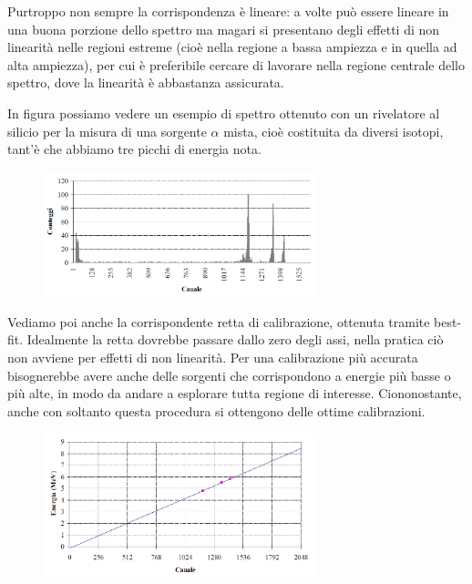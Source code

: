 Purtroppo non sempre la corrispondenza è lineare: a volte può essere lineare in una buona porzione dello spettro ma magari si presentano degli effetti di non linearità nelle regioni estreme (cioè nella regione a bassa ampiezza e in quella ad alta ampiezza), per cui è preferibile cercare di lavorare nella regione centrale dello spettro, dove la linearità è abbastanza assicurata.

\begin{esempio}
   In figura possiamo vedere un esempio di spettro ottenuto con un rivelatore al silicio per la misura di una sorgente $\alpha$ mista, cioè costituita da diversi isotopi, tant'è che abbiamo tre picchi di energia nota.
   \begin{figure}[H]
      \centering
      \includegraphics[width=0.7\textwidth]{immagini/esempio_calibrazione_spettro.png}
   \end{figure}
   Vediamo poi anche la corrispondente retta di calibrazione, ottenuta tramite best-fit. Idealmente la retta dovrebbe passare dallo zero degli assi, nella pratica ciò non avviene per effetti di non linearità. Per una calibrazione più accurata bisognerebbe avere anche delle sorgenti che corrispondono a energie più basse o più alte, in modo da andare a esplorare tutta regione di interesse. Ciononostante, anche con soltanto questa procedura si ottengono delle ottime calibrazioni.
   \begin{figure}[H]
      \centering
      \includegraphics[width=0.7\textwidth]{immagini/esempio_calibrazione_retta.png}
   \end{figure}
\end{esempio}

